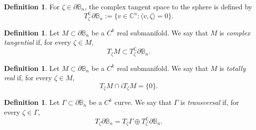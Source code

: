 \documentclass[a4paper,12pt]{amsart}
\theoremstyle{definition}
\newtheorem{defn}[thm]{Definition}
\theoremstyle{remark}
\def\Bn{\mathbb{B}_n}
\begin{document}
\begin{defn}
    For $\zeta \in \partial \Bn$, the complex tangent space to the sphere is
    defined by
    \begin{equation*}
        T_\zeta^{\mathbb C} \partial \Bn
        := \{ v \in \mathbb C^n :  \langle v , \zeta \rangle = 0 \}.
    \end{equation*}    
\end{defn}

\begin{defn}
Let $M \subset \mathbb \partial \Bn$ be a $C^k$ real submanifold.
We say that $M$ is \emph{complex tangential} if, for every $\zeta \in M$,
\begin{equation*}
    T_\zeta M \subset T_\zeta^{\mathbb C}\partial \Bn.
\end{equation*}
\end{defn}

\begin{defn}
    Let $M \subset \mathbb \partial \Bn$ be a $C^k$ real submanifold.
    We say that $M$ is \emph{totally real} if, for every $\zeta \in M$,
    \begin{equation*}
        T_\zeta M \cap i T_\zeta M = \{0\}.
    \end{equation*}
\end{defn}

\begin{defn}
Let $\Gamma \subset \partial \Bn$ be a $C^k$ curve.
We say that $\Gamma$ is \emph{transversal} if, for every $\zeta \in \Gamma$,
\begin{equation*}
    T_\zeta \partial \Bn
    = T_\zeta \Gamma \oplus T_\zeta^{\mathbb C} \partial \Bn.
\end{equation*}
\end{defn}
\end{document}
